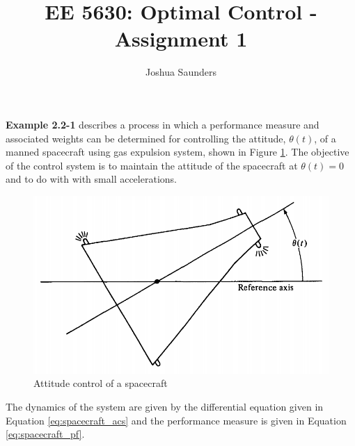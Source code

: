 \documentclass[12pt]{article}
\newenvironment{question}[2][Question]{\begin{trivlist}
\item[\hskip \labelsep {\bfseries #1}\hskip \labelsep {\bfseries #2.}]}{\end{trivlist}}
\begin{document}
 
 
\title{EE 5630: Optimal Control - Assignment 1}%
\author{Joshua Saunders\\ %
} %
 
\maketitle


\begin{question}{1}
\end{question}
\textbf{Example 2.2-1} describes a process in which a performance measure and 
associated weights can be determined for controlling the attitude, $\theta(t)$, 
of a manned spacecraft using gas expulsion system, shown in Figure \ref{fig:spacecraft_acs}.
The objective of the control system is to maintain the attitude of the
spacecraft at $\theta(t) = 0$ and to do with with small accelerations.

\begin{figure}[h]
    \includegraphics[scale=0.35]{spacecraft_acs}
    \centering
    \caption{Attitude control of a spacecraft \cite{kirkdover}}
    \label{fig:spacecraft_acs}
\end{figure}

The dynamics of the system are given by the differential equation given in 
Equation \ref{eq:spacecraft_acs} and the performance measure is given in
Equation \ref{eq:spacecraft_pf}.
\end{document}

